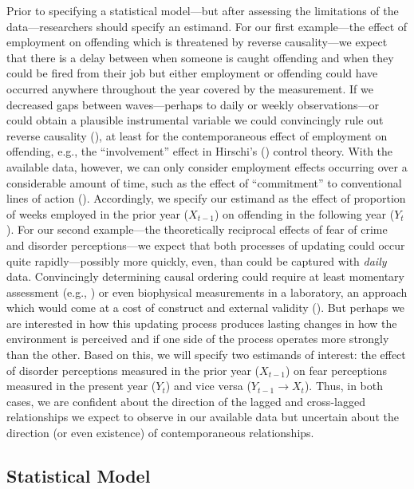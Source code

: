 \documentclass[
  letterpaper,
  DIV=11,
  numbers=noendperiod]{scrartcl}
\begin{document}
Prior to specifying a statistical model---but after assessing the
limitations of the data---researchers should specify an estimand. For
our first example---the effect of employment on offending which is
threatened by reverse causality---we expect that there is a delay
between when someone is caught offending and when they could be fired
from their job but either employment or offending could have occurred
anywhere throughout the year covered by the measurement. If we decreased
gaps between waves---perhaps to daily or weekly observations---or could
obtain a plausible instrumental variable we could convincingly rule out
reverse causality (), at least for the contemporaneous effect of employment on
offending, e.g., the ``involvement'' effect in Hirschi's
() control theory. With the
available data, however, we can only consider employment effects
occurring over a considerable amount of time, such as the effect of
``commitment'' to conventional lines of action
(). Accordingly, we
specify our estimand as the effect of proportion of weeks employed in
the prior year (\(X_{t-1}\)) on offending in the following year
(\(Y_t\)). For our second example---the theoretically reciprocal effects
of fear of crime and disorder perceptions---we expect that both
processes of updating could occur quite rapidly---possibly more quickly,
even, than could be captured with \emph{daily} data. Convincingly
determining causal ordering could require at least momentary assessment
(e.g., )
or even biophysical measurements in a laboratory, an approach which
would come at a cost of construct and external validity
().
But perhaps we are interested in how this updating process produces
lasting changes in how the environment is perceived and if one side of
the process operates more strongly than the other. Based on this, we
will specify two estimands of interest: the effect of disorder
perceptions measured in the prior year (\(X_{t-1}\)) on fear perceptions
measured in the present year (\(Y_t\)) and vice versa
(\(Y_{t-1} \rightarrow X_t\)). Thus, in both cases, we are confident
about the direction of the lagged and cross-lagged relationships we
expect to observe in our available data but uncertain about the
direction (or even existence) of contemporaneous relationships.

\subsection{Statistical Model}\label{statistical-model}
\end{document}
